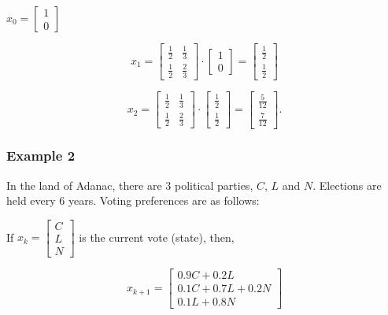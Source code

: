 \documentclass[12pt]{article}
\begin{document}
$x_0 = \begin{bmatrix} 1 \\ 0 \end{bmatrix}$

\[
  x_1 = \begin{bmatrix}
    \frac{1}{2} & \frac{1}{3}\\
    \frac{1}{2} & \frac{2}{3}
  \end{bmatrix}
  \cdot
  \begin{bmatrix} 1 \\ 0 \end{bmatrix}
  =
  \begin{bmatrix}
    \frac{1}{2} \\
    \frac{1}{2}
  \end{bmatrix}
\]

\[
  x_2 = \begin{bmatrix}
    \frac{1}{2} & \frac{1}{3} \\
    \frac{1}{2} & \frac{2}{3}
  \end{bmatrix}
  \cdot
  \begin{bmatrix}
    \frac{1}{2} \\
    \frac{1}{2}
  \end{bmatrix}
  =
  \begin{bmatrix}
    \frac{5}{12} \\
    \frac{7}{12}
  \end{bmatrix}
.\]

\subsubsection*{Example 2}

In the land of Adanac, there are $3$ political parties, $C$, $L$ and $N$.
Elections are held every $6$ years. Voting preferences are as follows:


If $x_k = \begin{bmatrix} C \\ L \\ N \end{bmatrix}$ is the current vote 
(state), then, 

\begin{equation*}
  x_{k+1} =
  \begin{bmatrix}
    0.9C + 0.2 L \\
    0.1C + 0.7L + 0.2N \\
    0.1L + 0.8N 
  \end{bmatrix}
\end{equation*}
\end{document}
